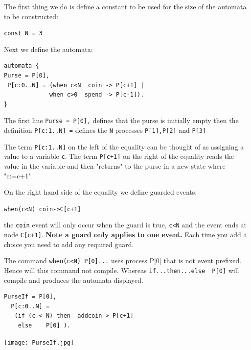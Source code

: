 \documentclass[]{article}
\begin{document}
The first thing we do is define a constant to be used for the size of the automata to be constructed:

\hspace{0.5in}\verb$const N = 3$

Next  we define the automata:

\begin{center}\begin{minipage}{0.5\textwidth}
\begin{verbatim}
automata {
Purse = P[0],
 P[c:0..N] = (when c<N  coin -> P[c+1] |
             when c>0  spend -> P[c-1]).
}\end{verbatim}
\end{minipage}\end{center}

The first line \verb|Purse = P[0],| defines that the purse is initially empty then  the definition \verb$P[c:1..N] =$    defines the \verb$N$ processes \verb$P[1],P[2]$ and \verb$P[3]$


The term \verb$P[c:1..N]$ on the left of the equality can be thought of  as assigning a value to a variable \verb$c$. The term \verb$P[c+1]$  on the right of the equality reads the value in the variable and then  "returns" to the purse in a new state where "c:=c+1".

On the right hand side of the equality we define guarded events:
\begin{center}\verb$when(c<N) coin->C[c+1]$ \end{center}
the \verb$coin$ event  will only occur when the guard is true, \verb|c<N| and the event  ends at node \verb$C[c+1]$.  {\bf Note a guard  only applies to one event.}  Each time you add a choice you need to add any required  guard.


The command {\color{red} \verb|when(c<N) P[0]...| }  uses process {\sf P[0]} that is not event prefixed. Hence will this command not compile.
Whereas  \verb|if...then...else  P[0]| will compile and produces the automata displayed.

\begin{center}\begin{minipage}{0.5\textwidth}
\begin{verbatim}
PurseIf = P[0],
  P[c:0..N] =
   (if (c < N) then  addcoin-> P[c+1]
    else    P[0] ).\end{verbatim}
\end{minipage}
\begin{minipage}{0.3\textwidth}
\texttt{[image: PurseIf.jpg]}
\end{minipage}\end{center}
\end{document}
